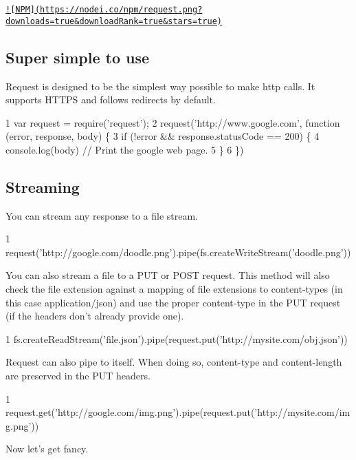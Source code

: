 \href{https://nodei.co/npm/request/}{\tt !\mbox{[}N\+P\+M\mbox{]}(https\+://nodei.\+co/npm/request.\+png?downloads=true\&download\+Rank=true\&stars=true)}

\subsection*{Super simple to use}

Request is designed to be the simplest way possible to make http calls. It supports H\+T\+T\+P\+S and follows redirects by default.


\begin{DoxyCode}
1 var request = require('request');
2 request('http://www.google.com', function (error, response, body) \{
3   if (!error && response.statusCode == 200) \{
4     console.log(body) // Print the google web page.
5   \}
6 \})
\end{DoxyCode}


\subsection*{Streaming}

You can stream any response to a file stream.


\begin{DoxyCode}
1 request('http://google.com/doodle.png').pipe(fs.createWriteStream('doodle.png'))
\end{DoxyCode}


You can also stream a file to a P\+U\+T or P\+O\+S\+T request. This method will also check the file extension against a mapping of file extensions to content-\/types (in this case {\ttfamily application/json}) and use the proper {\ttfamily content-\/type} in the P\+U\+T request (if the headers don’t already provide one).


\begin{DoxyCode}
1 fs.createReadStream('file.json').pipe(request.put('http://mysite.com/obj.json'))
\end{DoxyCode}


Request can also {\ttfamily pipe} to itself. When doing so, {\ttfamily content-\/type} and {\ttfamily content-\/length} are preserved in the P\+U\+T headers.


\begin{DoxyCode}
1 request.get('http://google.com/img.png').pipe(request.put('http://mysite.com/img.png'))
\end{DoxyCode}


Now let’s get fancy.


